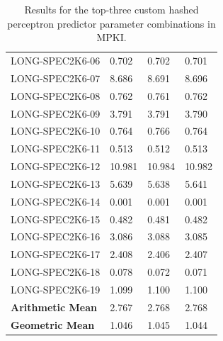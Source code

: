 \documentclass{article}
\begin{document}
\begin{table}[h]
\begin{tabular}{llll}
        LONG-SPEC2K6-06  & 0.702 & 0.702 & 0.701 \\
        LONG-SPEC2K6-07  & 8.686 & 8.691 & 8.696 \\
        LONG-SPEC2K6-08  & 0.762 & 0.761 & 0.762 \\
        LONG-SPEC2K6-09  & 3.791 & 3.791 & 3.790 \\
        LONG-SPEC2K6-10  & 0.764 & 0.766 & 0.764 \\
        LONG-SPEC2K6-11  & 0.513 & 0.512 & 0.513 \\
        LONG-SPEC2K6-12  & 10.981 & 10.984 & 10.982 \\
        LONG-SPEC2K6-13  & 5.639 & 5.638 & 5.641 \\
        LONG-SPEC2K6-14  & 0.001 & 0.001 & 0.001 \\
        LONG-SPEC2K6-15  & 0.482 & 0.481 & 0.482 \\
        LONG-SPEC2K6-16  & 3.086 & 3.088 & 3.085 \\
        LONG-SPEC2K6-17  & 2.408 & 2.406 & 2.407 \\
        LONG-SPEC2K6-18  & 0.078 & 0.072 & 0.071 \\
        LONG-SPEC2K6-19  & 1.099 & 1.100 & 1.100 \\
        \midrule
        \textbf{Arithmetic Mean} & 2.767 & 2.768 & 2.768 \\
        \textbf{Geometric Mean} & 1.046 & 1.045 & 1.044 \\
        \bottomrule
    \end{tabular}
    \caption{Results for the top-three custom hashed perceptron predictor parameter combinations in MPKI.}
    \label{tab:custom_res}
\end{table}
\end{document}
